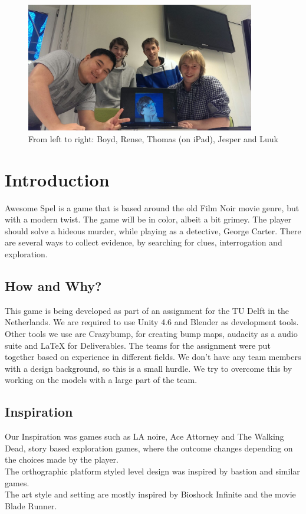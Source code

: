 \documentclass{article}
\begin{document}
	\begin{figure}[ht!]
		\centering
		\includegraphics[width=100mm]{images/Team.jpg}
		\caption{From left to right: Boyd, Rense, Thomas (on iPad), Jesper and Luuk}
		\end{figure}

	\newpage

\section{Introduction}
	Awesome Spel is a game that is based around the old Film Noir movie genre, but with a modern twist. The game will be in color, albeit a bit grimey. The player should solve a hideous murder, while playing as a detective, George Carter. There are several ways to collect evidence, by searching for clues, interrogation and exploration.

	\subsection{How and Why?}
		This game is being developed as part of an assignment for the TU Delft in the Netherlands. We are required to use Unity 4.6 and Blender as development tools. Other tools we use are Crazybump, for creating bump maps, audacity as a audio suite and LaTeX for Deliverables. The teams for the assignment were put together based on experience in different fields. We don't have any team members with a design background, so this is a small hurdle. We try to overcome this by working on the models with a large part of the team.

	\subsection{Inspiration}
		Our Inspiration was games such as LA noire, Ace Attorney and The Walking Dead, story based exploration games, where the outcome changes depending on the choices made by the player.\\
		The orthographic platform styled level design was inspired by bastion and similar games.\\
		The art style and setting are mostly inspired by Bioshock Infinite and the movie Blade Runner.
\end{document}
